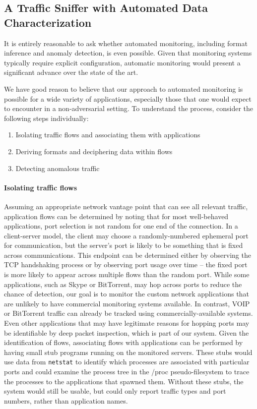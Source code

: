 \subsection{A Traffic Sniffer with Automated Data Characterization}
\label{sec:sniffer}

It is entirely reasonable to ask whether automated monitoring,
including format inference and anomaly detection, is even
possible. Given that monitoring systems typically require explicit
configuration, automatic monitoring would present a significant
advance over the state of the art.

We have good reason to believe that our approach to automated
monitoring is possible for a wide variety of applications, especially
those that one would expect to encounter in a non-adversarial setting.
To understand the process, consider the following steps individually:

\begin{enumerate}
\item Isolating traffic flows and associating them with applications
\item Deriving formats and deciphering data within flows
\item Detecting anomalous traffic
\end{enumerate}

\paragraph*{Isolating traffic flows} Assuming an appropriate network
vantage point that can see all relevant traffic, application flows can
be determined by noting that for most well-behaved applications, port
selection is not random for one end of the connection. In a
client-server model, the client may choose a randomly-numbered
ephemeral port for communication, but the server's port is likely to
be something that is fixed across communications. This endpoint can be
determined either by observing the TCP handshaking process or by
observing port usage over time -- the fixed port is more likely to
appear across multiple flows than the random port. While some
applications, such as Skype or BitTorrent, may hop across ports to
reduce the chance of detection, our goal is to monitor the custom
network applications that are unlikely to have commercial monitoring
systems available. In contrast, VOIP or BitTorrent traffic can already
be tracked using commercially-available systems. Even other
applications that may have legitimate reasons for hopping ports may be
identifiable by deep packet inspection, which is part of our
system. Given the identification of flows, associating flows with
applications can be performed by having small stub programs running on
the monitored servers. These stubs would use data from \texttt{netstat}
to identify which processes are associated with particular ports and
could examine the process tree in the /proc pseudo-filesystem to trace
the processes to the applications that spawned them. Without these
stubs, the system would still be usable, but could only report traffic
types and port numbers, rather than application names.

